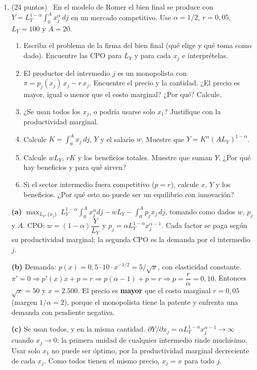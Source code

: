 \documentclass[12pt,letterpaper]{article}
\newcommand{\opc}[1]{\fbox{\footnotesize opcional · $p\approx #1$}\,}
\begin{document}
\begin{enumerate}[label=\arabic*.,leftmargin=1.6em,itemsep=0.8em]
\item (24 puntos) \opc{0{,}50} En el modelo de Romer el bien final se produce con $Y=L_Y^{1-\alpha}\int_0^A x_j^{\alpha}\,dj$ en un mercado competitivo. Use $\alpha=1/2$, $r=0{,}05$, $L_Y=100$ y $A=20$.
\begin{enumerate}[label=(\alph*)]
\item Escriba el problema de la firma del bien final (qué elige y qué toma como dado). Encuentre las CPO para $L_Y$ y para cada $x_j$ e interprételas.
\item El productor del intermedio $j$ es un monopolista con $\pi=p_j(x_j)\,x_j-r\,x_j$. Encuentre el precio y la cantidad. ¿El precio es mayor, igual o menor que el costo marginal? ¿Por qué? Calcule.
\item ¿Se usan todos los $x_j$, o podría usarse solo $x_1$? Justifique con la productividad marginal.
\item Calcule $K=\int_0^A x_j\,dj$, $Y$ y el salario $w$. Muestre que $Y=K^{\alpha}(AL_Y)^{1-\alpha}$.
\item Calcule $wL_Y$, $rK$ y los beneficios totales. Muestre que suman $Y$. ¿Por qué hay beneficios y para qué sirven?
\item Si el sector intermedio fuera competitivo ($p=r$), calcule $x$, $Y$ y los beneficios. ¿Por qué esto no puede ser un equilibrio con innovación?
\end{enumerate}
\begin{resp}
\textbf{(a)} $\max_{L_Y,\{x_j\}}\ L_Y^{1-\alpha}\int_0^A x_j^{\alpha}dj-wL_Y-\int_0^A p_jx_j\,dj$, tomando como dados $w$, $p_j$ y $A$. CPO: $w=(1-\alpha)\dfrac{Y}{L_Y}$ y $p_j=\alpha L_Y^{1-\alpha}x_j^{\alpha-1}$. Cada factor se paga según su productividad marginal; la segunda CPO es la demanda por el intermedio $j$.

\textbf{(b)} Demanda: $p(x)=0{,}5\cdot10\cdot x^{-1/2}=5/\sqrt x$, con elasticidad constante. $\pi'=0\Rightarrow p'(x)x+p=r\Rightarrow p(\alpha-1)+p=r\Rightarrow p=\dfrac{r}{\alpha}=0{,}10$. Entonces $\sqrt x=50$ y $x=2.500$. El precio es \textbf{mayor} que el costo marginal $r=0{,}05$ (margen $1/\alpha=2$), porque el monopolista tiene la patente y enfrenta una demanda con pendiente negativa.

\textbf{(c)} Se usan todos, y en la misma cantidad. $\partial Y/\partial x_j=\alpha L_Y^{1-\alpha}x_j^{\alpha-1}\to\infty$ cuando $x_j\to0$: la primera unidad de cualquier intermedio rinde muchísimo. Usar solo $x_1$ no puede ser óptimo, por la productividad marginal decreciente de cada $x_j$. Como todos tienen el mismo precio, $x_j=x$ para todo $j$.


\end{resp}
\end{enumerate}
\end{document}
